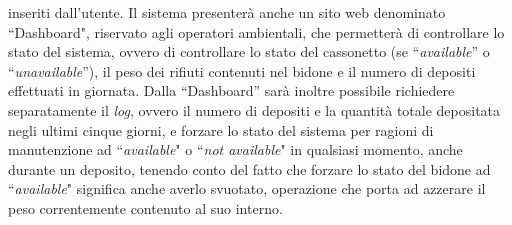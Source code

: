 \documentclass[a4paper, 12pt]{report}
\begin{document}
	inseriti dall'utente.\newline
	Il sistema presenterà anche un sito web denominato ``Dashboard", riservato agli operatori
	ambientali, che permetterà di controllare lo stato del sistema, ovvero di controllare lo stato del
	cassonetto (se ``\textit{available}'' o ``\textit{unavailable}''), il peso dei rifiuti contenuti nel bidone e il 
	numero di depositi effettuati in giornata. Dalla ``Dashboard'' sarà inoltre possibile richiedere separatamente il \textit{log},
	ovvero il numero di depositi e la quantità totale depositata negli ultimi cinque giorni, e
	forzare lo stato del sistema per ragioni di manutenzione ad ``\textit{available}" o
	``\textit{not available}" in qualsiasi momento, anche durante un deposito, tenendo conto del fatto
	che forzare lo stato del bidone ad ``\textit{available}" significa anche averlo svuotato, operazione che 
	porta ad azzerare il peso correntemente contenuto al suo interno.
\end{document}
